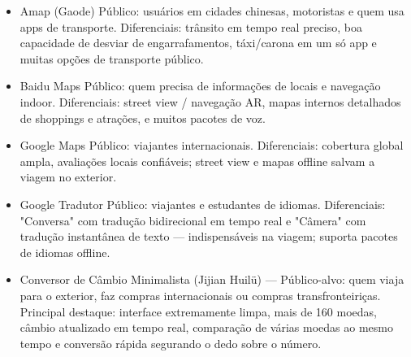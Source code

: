 \begin{itemize}
  \item Amap (Gaode) Público: usuários em cidades chinesas, motoristas e quem usa apps de transporte. Diferenciais: trânsito em tempo real preciso, boa capacidade de desviar de engarrafamentos, táxi/carona em um só app e muitas opções de transporte público.
  \item Baidu Maps Público: quem precisa de informações de locais e navegação indoor. Diferenciais: street view / navegação AR, mapas internos detalhados de shoppings e atrações, e muitos pacotes de voz.
  \item Google Maps Público: viajantes internacionais. Diferenciais: cobertura global ampla, avaliações locais confiáveis; street view e mapas offline salvam a viagem no exterior.
\end{itemize}


\begin{itemize}
  \item Google Tradutor Público: viajantes e estudantes de idiomas. Diferenciais: "Conversa" com tradução bidirecional em tempo real e "Câmera" com tradução instantânea de texto — indispensáveis na viagem; suporta pacotes de idiomas offline.
\end{itemize}


\begin{itemize}
  \item Conversor de Câmbio Minimalista (Jijian Huilü) — Público-alvo: quem viaja para o exterior, faz compras internacionais ou compras transfronteiriças. Principal destaque: interface extremamente limpa, mais de 160 moedas, câmbio atualizado em tempo real, comparação de várias moedas ao mesmo tempo e conversão rápida segurando o dedo sobre o número.
\end{itemize}


